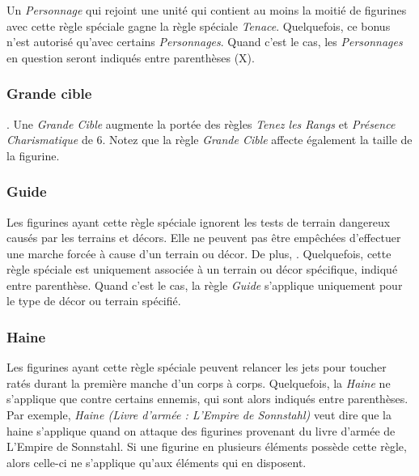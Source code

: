 \subsubsection*{}

Un \emph{Personnage} qui rejoint une unité qui contient au moins la moitié de figurines avec cette règle spéciale gagne la règle spéciale \emph{Tenace}. Quelquefois, ce bonus n'est autorisé qu'avec certains \emph{Personnages}. Quand c'est le cas, les \emph{Personnages} en question seront indiqués entre parenthèses (X).

\subsubsection*{Grande cible}

. Une \emph{Grande Cible} augmente la portée des règles \emph{Tenez les Rangs} et \emph{Présence Charismatique} de 6{\pouce}. Notez que la règle \emph{Grande Cible} affecte également la taille de la figurine.

\subsubsection*{Guide}

Les figurines ayant cette règle spéciale ignorent les tests de terrain dangereux causés par les terrains et décors. Elle ne peuvent pas être empêchées d'effectuer une marche forcée à cause d'un terrain ou décor. De plus, . Quelquefois, cette règle spéciale est uniquement associée à un terrain ou décor spécifique, indiqué entre parenthèse. Quand c'est le cas, la règle \emph{Guide} s'applique uniquement pour le type de décor ou terrain spécifié.

\subsubsection*{Haine}

Les figurines ayant cette règle spéciale peuvent relancer les jets pour toucher ratés durant la première manche d'un corps à corps. Quelquefois, la \emph{Haine} ne s'applique que contre certains ennemis, qui sont alors indiqués entre parenthèses. Par exemple, \emph{Haine (Livre d'armée : L'Empire de Sonnstahl)} veut dire que la haine s'applique quand on attaque des figurines provenant du livre d'armée de L'Empire de Sonnstahl. Si une figurine en plusieurs éléments possède cette règle, alors celle-ci ne s'applique qu'aux éléments qui en disposent.

